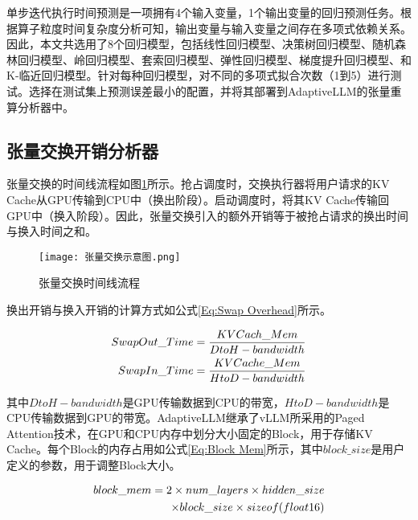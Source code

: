 单步迭代执行时间预测是一项拥有4个输入变量，1个输出变量的回归预测任务。根据算子粒度时间复杂度分析可知，输出变量与输入变量之间存在多项式依赖关系。因此，本文共选用了8个回归模型，包括线性回归模型、决策树回归模型、随机森林回归模型、岭回归模型、套索回归模型、弹性回归模型、梯度提升回归模型、和K-临近回归模型。针对每种回归模型，对不同的多项式拟合次数（1到5）进行测试。选择在测试集上预测误差最小的配置，并将其部署到AdaptiveLLM的张量重算分析器中。 

\subsection{张量交换开销分析器}

张量交换的时间线流程如图\ref{Fig:张量交换示意图}所示。抢占调度时，交换执行器将用户请求的KV Cache从GPU传输到CPU中（换出阶段）。启动调度时，将其KV Cache传输回GPU中（换入阶段）。因此，张量交换引入的额外开销等于被抢占请求的换出时间与换入时间之和。

\begin{figure}[!htbp]
  \centering
  \texttt{[image: 张量交换示意图.png]}
  \caption{张量交换时间线流程}
  \label{Fig:张量交换示意图}
\end{figure}

换出开销与换入开销的计算方式如公式\ref{Eq:Swap Overhead}所示。

\begin{equation}
  \begin{aligned}
    SwapOut\_Time=\frac{KVCach\_Mem}{DtoH-bandwidth} \\
    SwapIn\_Time=\frac{KVCache\_Mem}{HtoD-bandwidth}
  \end{aligned}
  \label{Eq:Swap Overhead}
  \setlength{\abovedisplayskip}{0ex}
  \setlength{\belowdisplayskip}{2ex}
\end{equation}

其中$DtoH-bandwidth$是GPU传输数据到CPU的带宽，$HtoD-bandwidth$是CPU传输数据到GPU的带宽。AdaptiveLLM继承了vLLM所采用的Paged Attention技术，在GPU和CPU内存中划分大小固定的Block，用于存储KV Cache。每个Block的内存占用如公式\ref{Eq:Block Mem}所示，其中$block\_size$是用户定义的参数，用于调整Block大小。

\begin{equation}
  \begin{aligned}
    block\_mem = 2 \times num\_layers \times hidden\_size \\ 
    \times block\_size \times sizeof(float16)
  \end{aligned}
  \label{Eq:Block Mem}
  \setlength{\abovedisplayskip}{0ex}
  \setlength{\belowdisplayskip}{2ex}
\end{equation}

